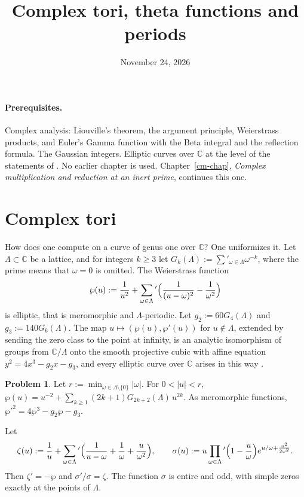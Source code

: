 \documentclass[reqno]{amsart}
\title{Complex tori, theta functions and periods}
\author{}
\date{November 24, 2026}
\newcounter{chap}
\theoremstyle{definition}
\newtheorem{problem}{Problem}[section]
\theoremstyle{plain}
\newcommand{\C}{\mathbb{C}}
\begin{document}
\maketitle
{}\label{chap}

\paragraph{Prerequisites.}
Complex analysis: Liouville's theorem, the argument principle, Weierstrass products, and Euler's Gamma function with the Beta integral and the reflection formula.  The Gaussian integers.  Elliptic curves over \(\C\) at the level of the statements of \cite[Ch.~VI]{Si1}.  No earlier chapter is used.  Chapter~\ref{cm-chap}, \emph{Complex multiplication and reduction at an inert prime}, continues this one.

\section{Complex tori}\label{sec:tori}

How does one compute on a curve of genus one over \(\C\)?  One uniformizes it.  Let \(\Lambda \subset \C\) be a lattice, and for integers \(k \ge 3\) let \(G_k(\Lambda) := \sum'_{\omega \in \Lambda} \omega^{-k}\), where the prime means that \(\omega = 0\) is omitted.  The Weierstrass function
\[
  \wp(u) := \frac{1}{u^2} + \sum_{\omega \in \Lambda}{}' \Bigl( \frac{1}{(u - \omega)^2} - \frac{1}{\omega^2} \Bigr)
\]
is elliptic, that is meromorphic and \(\Lambda\)-periodic.  Let \(g_2 := 60 G_4(\Lambda)\) and \(g_3 := 140 G_6(\Lambda)\).  The map \(u \mapsto (\wp(u), \wp'(u))\) for \(u \notin \Lambda\), extended by sending the zero class to the point at infinity, is an analytic isomorphism of groups from \(\C/\Lambda\) onto the smooth projective cubic with affine equation \(y^2 = 4x^3 - g_2 x - g_3\), and every elliptic curve over \(\C\) arises in this way \cite[\S\S VI.3--VI.5]{Si1}.

\begin{problem}\label{pr:wp-laurent}
Let \(r := \min_{\omega\in\Lambda\setminus\{0\}}\lvert\omega\rvert\).  For \(0<\lvert u\rvert<r\), \(\wp(u) = u^{-2} + \sum_{k \ge 1}(2k+1)G_{2k+2}(\Lambda)\,u^{2k}\).  As meromorphic functions, \(\wp'^2 = 4\wp^3 - g_2\wp - g_3\).
\end{problem}

Let
\[
  \zeta(u) := \frac1u + \sum_{\omega \in \Lambda}{}' \Bigl( \frac{1}{u - \omega} + \frac{1}{\omega} + \frac{u}{\omega^2} \Bigr),
  \qquad
  \sigma(u) := u \prod_{\omega \in \Lambda}{}' \Bigl(1 - \frac{u}{\omega}\Bigr) e^{u/\omega + \frac{u^2}{2\omega^2}} .
\]
Then \(\zeta' = -\wp\) and \(\sigma'/\sigma = \zeta\).  The function \(\sigma\) is entire and odd, with simple zeros exactly at the points of \(\Lambda\).
\end{document}
